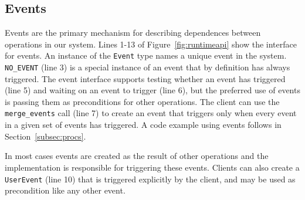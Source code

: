 \subsection{Events}
\label{subsec:events}
Events are the primary mechanism for describing dependences between operations in our system.
Lines 1-13 of Figure~\ref{fig:runtimeapi} show the interface for events.  An instance of the {\tt Event} type 
names a unique event in the system.  {\tt NO\_EVENT} (line 3)
is a special instance
of an event that by definition has always triggered.  The event interface
supports testing whether an event has triggered (line 5) and waiting on
an event to trigger (line 6), but the preferred
use of events is passing them as preconditions for other operations.  The client can use the
{\tt merge\_events} call (line 7) to create an event that triggers only when every
event in a given set of events has triggered.  A code example using events follows in
Section~\ref{subsec:procs}.

In most cases events are created as the result of other
operations and the implementation is responsible for triggering these events.  Clients
can also create a {\tt UserEvent} (line 10) that is triggered explicitly by the client,
and may be used as precondition like any other event.



